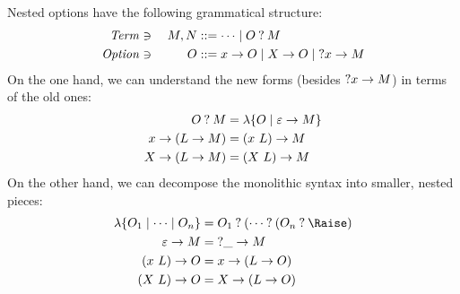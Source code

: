 \documentclass[sigplan,screen]{acmart}
\begin{document}
Nested options have the following grammatical structure:
\begin{alignat*}{2}
  \mathit{Term} &\ni{}& M, N
  &::= \dots
  \mid O \mathbin{?} M
  \\
  \mathit{Option} &\ni{}& O
  &::= x \to O
  \mid X \to O
  \mid \mathbin{?} x \to M
\end{alignat*}
On the one hand, we can understand the new forms (besides $\mathbin{?} x \to M$) in
terms of the old ones:
\begin{align*}
  O \mathbin{?} M &= \lambda\{O \mid \varepsilon \to M\}
  \\
  x \to (L \to M) &= (x~L) \to M
  \\
  X \to (L \to M) &= (X~L) \to M
\end{align*}
On the other hand, we can decompose the monolithic syntax into smaller, nested
pieces:
\begin{align*}
  \lambda\{O_1 \mid \dots \mid O_n\}
  &=
  O_1 \ask (\dots \ask (O_n \ask \Raise)
  \\
  \varepsilon \to M &= \ask \_ \to M
  \\
  (x~L) \to O &= x \to (L \to O)
  \\
  (X~L) \to O &= X \to (L \to O)
\end{align*}
\end{document}
